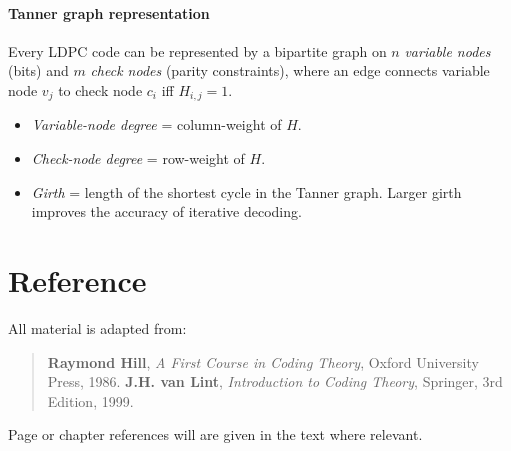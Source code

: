 \documentclass[11pt,a4paper]{article}
\theoremstyle{definition}
\theoremstyle{plain}
\theoremstyle{remark}
\begin{document}
\paragraph{Tanner graph representation} 
Every LDPC code can be represented by a bipartite graph on $n$ \emph{variable nodes} (bits) and $m$ \emph{check nodes} (parity constraints), where an edge connects variable node $v_j$ to check node $c_i$ iff $H_{i,j}=1$.  
\begin{itemize}
  \item \emph{Variable-node degree} = column-weight of $H$.  
  \item \emph{Check-node degree} = row-weight of $H$.  
  \item \emph{Girth} = length of the shortest cycle in the Tanner graph.  Larger girth improves the accuracy of iterative decoding.
\end{itemize}

\section{Reference}
All material is adapted from: 
\begin{quote}
    \textbf{Raymond Hill}, \emph{A First Course in Coding Theory}, Oxford University Press, 1986.
    \textbf{J.H. van Lint}, \emph{Introduction to Coding Theory}, Springer, 3rd Edition, 1999.
\end{quote}
Page or chapter references will are given in the text where relevant. 
\end{document}
